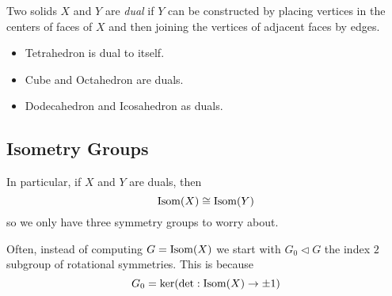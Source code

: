 \documentclass{article}
\begin{document}
\begin{defi}[Dual]
    Two solids $X$ and $Y$ are \emph{dual} if $Y$ can be constructed by placing vertices in the centers of faces of $X$ and then joining the vertices of adjacent faces by edges.
\end{defi}
\begin{eg}\leavevmode
    \begin{itemize}
        \item Tetrahedron is dual to itself.
        \item Cube and Octahedron are duals.
        \item Dodecahedron and Icosahedron as duals.
    \end{itemize}
\end{eg}

\subsection{Isometry Groups}
In particular, if $X$ and $Y$ are duals, then
\[
    \operatorname{Isom}(X) \cong \operatorname{Isom}(Y)
\]
so we only have three symmetry groups to worry about.

Often, instead of computing $G = \operatorname{Isom}(X)$ we start with $G_0 \triangleleft G$ the index $2$ subgroup of rotational symmetries.
This is because 
\[
    G_0 = \ker (\det: \operatorname{Isom}(X) \rightarrow {\pm 1})    
\]
\end{document}
